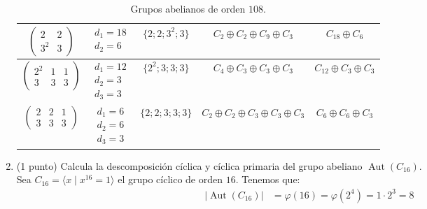 \documentclass[12pt]{article}
\DeclareMathOperator{\Aut}{Aut}
\begin{document}
\begin{ejercicio}
\begin{enumerate}
\begin{table}[h]
\begin{tabular}{c|c|c|c|c}
                $\begin{pmatrix}
                    2 & 2\\
                    3^2 & 3
                \end{pmatrix}
                $ & $\begin{array}{l}
                    d_1=18 \\
                    d_2=6
                \end{array}$ & $\{2; 2; 3^2; 3\}$ & $C_2 \oplus C_2 \oplus C_9 \oplus C_3$ & $C_{18} \oplus C_6$ \\ \hline
                $\begin{pmatrix}
                    2^2 & 1 & 1\\
                    3 & 3 & 3
                \end{pmatrix}
                $ & $\begin{array}{l}
                    d_1=12 \\
                    d_2=3 \\
                    d_3=3
                \end{array}$ & $\{2^2; 3; 3; 3\}$ & $C_4 \oplus C_3 \oplus C_3 \oplus C_3$ & $C_{12} \oplus C_3 \oplus C_3$ \\ \hline
                $\begin{pmatrix}
                    2 & 2 & 1\\
                    3 & 3 & 3
                \end{pmatrix}
                $ & $\begin{array}{l}
                    d_1=6 \\
                    d_2=6 \\
                    d_3=3
                \end{array}$ & $\{2; 2; 3; 3; 3\}$ & $C_2 \oplus C_2 \oplus C_3 \oplus C_3 \oplus C_3$ & $C_6 \oplus C_6 \oplus C_3$
            \end{tabular}
            \caption{Grupos abelianos de orden $108$.}
            \label{tab:grupos_abelianos_108}
        \end{table}





            \item (1 punto) Calcula la descomposición cíclica y cíclica primaria del grupo abeliano $\Aut(C_{16})$.\\
            
            Sea $C_16=\langle x\mid x^{16}=1\rangle$ el grupo cíclico de orden $16$. Tenemos que:
            \begin{align*}
                |\Aut(C_{16})| & = \varphi(16) = \varphi(2^4) = 1\cdot 2^3=8
            \end{align*}


\end{enumerate}
\end{ejercicio}
\end{document}
